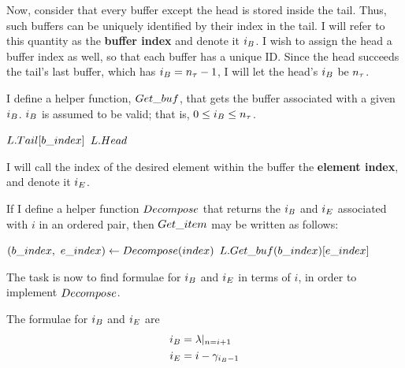 Now, consider that every buffer except the head is stored inside the tail. Thus, such buffers can be uniquely identified by their index in the tail. I will refer to this quantity as the \textbf{buffer index} and denote it $i_B$. I wish to assign the head a buffer index as well, so that each buffer has a unique ID. Since the head succeeds the tail's last buffer, which has $i_B = n_\tau - 1$, I will let the head's $i_B$ be $n_\tau$.

I define a helper function, $\FuncGetBuffer$, that gets the buffer associated with a given $i_B$. $i_B$ is assumed to be valid; that is, $0 \leq i_B \leq n_\tau$.

\begin{algorithm}
	\begin{algorithmic}
		\Function{$\FuncGetBuffer$}{$\VarList,\ \LclIndexBuffer$}
				\State \Return $L.Tail[b\_index]$
			\Else
				\State \Return $L.Head$
			\EndIf
		\EndFunction
	\end{algorithmic}
\end{algorithm}

I will call the index of the desired element within the buffer the \textbf{element index}, and denote it $i_E$.

If I define a helper function $Decompose$ that returns the $i_B$ and $i_E$ associated with $i$ in an ordered pair, then $\FuncGetItem$ may be written as follows:

\begin{algorithm}
	\begin{algorithmic}
		\Function{$\FuncGetItem$}{$\VarList,\ \ParamIndex$}
			\State $(b\_index,\ e\_index) \gets Decompose(index)$
			\State \Return $L.Get\_buf(b\_index)[e\_index]$
		\EndFunction
	\end{algorithmic}
\end{algorithm}

The task is now to find formulae for $i_B$ and $i_E$ in terms of $i$, in order to implement $Decompose$.

\begin{lemma}
	The formulae for $i_B$ and $i_E$ are
	\begin{align*}
	i_B &= \lambda|_{n = i + 1}\\
	i_E &= i - \gamma_{i_B - 1}
	\end{align*}
\end{lemma}

